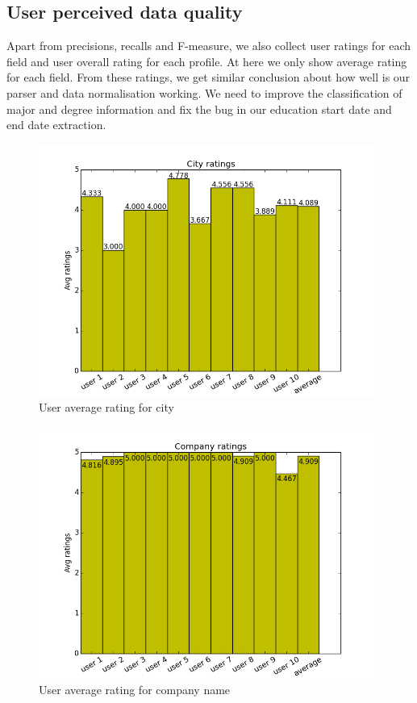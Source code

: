 \subsection{User perceived data quality}

Apart from precisions, recalls and F-measure, we also collect user ratings for each field and user overall rating for each profile. At here we only show average rating for each field. From these ratings, we get similar conclusion about how well is our parser and data normalisation working. We need to improve the classification of major and degree information and fix the bug in our education start date and end date extraction.

\begin{figure}[H]
\centering
\includegraphics[width=110mm]{images/evaluation/average_city_score.png}
\caption{User average rating for city}
\label{fig:city}
\end{figure}

\begin{figure}[H]
\centering
\includegraphics[width=110mm]{images/evaluation/average_company_score.png}
\caption{User average rating for company name}
\label{fig:company}
\end{figure}

